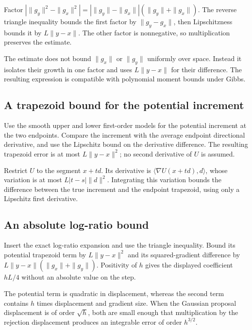 \documentclass[11pt,a4paper]{report}
\begin{document}
Factor \(|\|g_y\|^2-\|g_x\|^2|=|\|g_y\|-\|g_x\||(\|g_y\|+\|g_x\|)\). The reverse triangle inequality bounds the first factor by \(\|g_y-g_x\|\), then Lipschitzness bounds it by \(L\|y-x\|\). The other factor is nonnegative, so multiplication preserves the estimate.



The estimate does not bound \(\|g_x\|\) or \(\|g_y\|\) uniformly over space. Instead it isolates their growth in one factor and uses \(L\|y-x\|\) for their difference. The resulting expression is compatible with polynomial moment bounds under Gibbs.

\subsection{\texorpdfstring{A trapezoid bound for the potential increment}{A trapezoid bound for the potential increment}}
\label{report-step-UnadjustedLangevin-MALAError-lean-5}


Use the smooth upper and lower first-order models for the potential increment at the two endpoints. Compare the increment with the average endpoint directional derivative, and use the Lipschitz bound on the derivative difference. The resulting trapezoid error is at most \(L\|y-x\|^2\); no second derivative of \(U\) is assumed.



Restrict \(U\) to the segment \(x+td\). Its derivative is \(\langle\nabla U(x+td),d\rangle\), whose variation is at most \(L|t-s|\|d\|^2\). Integrating this variation bounds the difference between the true increment and the endpoint trapezoid, using only a Lipschitz first derivative.

\subsection{\texorpdfstring{An absolute log-ratio bound}{An absolute log-ratio bound}}
\label{report-step-UnadjustedLangevin-MALAError-lean-6}


Insert the exact log-ratio expansion and use the triangle inequality. Bound its potential trapezoid term by \(L\|y-x\|^2\) and its squared-gradient difference by \(L\|y-x\|(\|g_x\|+\|g_y\|)\). Positivity of \(h\) gives the displayed coefficient \(hL/4\) without an absolute value on the step.



The potential term is quadratic in displacement, whereas the second term contains \(h\) times displacement and gradient size. When the Gaussian proposal displacement is of order \(\sqrt h\), both are small enough that multiplication by the rejection displacement produces an integrable error of order \(h^{3/2}\).
\end{document}
